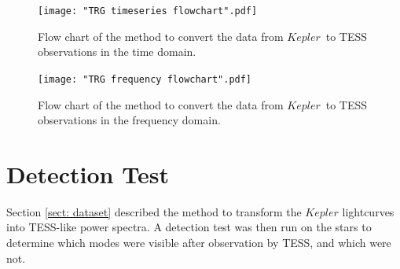 \documentclass[a4paper,fleqn,usenatbib,useAMS]{mnras}
\newcommand{\kep}{\ensuremath{Kepler}\:}
\begin{document}
\onecolumn
\begin{figure}
	\centering
	\texttt{[image: "TRG timeseries flowchart".pdf]}
	\caption{Flow chart of the method to convert the data from \kep \ to TESS observations in the time domain.}	
	\label{ts flowchart}
\end{figure} 

\begin{figure}
	\centering
	\texttt{[image: "TRG frequency flowchart".pdf]}
	\caption{Flow chart of the method to convert the data from \kep \ to TESS observations in the frequency domain.}	
	\label{fr flowchart}
\end{figure}
\newpage
\twocolumn



\section{Detection Test}
\label{sect: det_test}

Section \ref{sect: dataset} described the method to transform the $Kepler$ lightcurves into TESS-like power spectra. A detection test was then run on the stars to determine which modes were visible after observation by TESS, and which were not.
\end{document}
